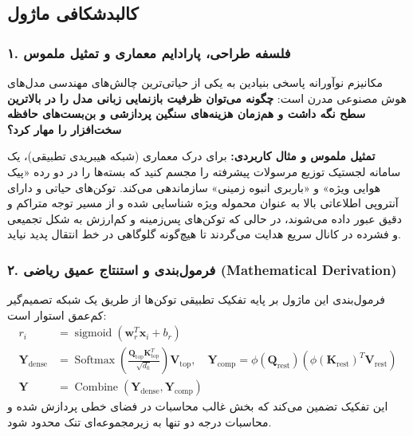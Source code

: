 \subsection{کالبدشکافی ماژول }

\subsubsection*{۱. فلسفه طراحی، پارادایم معماری و تمثیل ملموس}
مکانیزم نوآورانه  پاسخی بنیادین به یکی از حیاتی‌ترین چالش‌های مهندسی مدل‌های هوش مصنوعی مدرن است: \textbf{چگونه می‌توان ظرفیت بازنمایی زبانی مدل را در بالاترین سطح نگه داشت و هم‌زمان هزینه‌های سنگین پردازشی و بن‌بست‌های حافظه سخت‌افزار را مهار کرد؟}

\textbf{تمثیل ملموس و مثال کاربردی:}
برای درک معماری  (شبکه هیبریدی تطبیقی)، یک سامانه لجستیک توزیع مرسولات پیشرفته را مجسم کنید که بسته‌ها را در دو رده «پیک هوایی ویژه» و «باربری انبوه زمینی» سازماندهی می‌کند. توکن‌های حیاتی و دارای آنتروپی اطلاعاتی بالا به عنوان محموله ویژه شناسایی شده و از مسیر توجه متراکم و دقیق عبور داده می‌شوند، در حالی که توکن‌های پس‌زمینه و کم‌ارزش به شکل تجمیعی و فشرده در کانال سریع هدایت می‌گردند تا هیچ‌گونه گلوگاهی در خط انتقال پدید نیاید.

\subsubsection*{۲. فرمول‌بندی و استنتاج عمیق ریاضی (Mathematical Derivation)}
فرمول‌بندی این ماژول بر پایه تفکیک تطبیقی توکن‌ها از طریق یک شبکه تصمیم‌گیر کم‌عمق استوار است:
\begin{align}
r_i &= \operatorname{sigmoid}(\mathbf{w}_r^T \mathbf{x}_i + b_r) \\
\mathbf{Y}_{\text{dense}} &= \operatorname{Softmax}\left(\frac{\mathbf{Q}_{\text{top}} \mathbf{K}_{\text{top}}^T}{\sqrt{d_k}}\right) \mathbf{V}_{\text{top}}, \quad \mathbf{Y}_{\text{comp}} = \phi(\mathbf{Q}_{\text{rest}}) (\phi(\mathbf{K}_{\text{rest}})^T \mathbf{V}_{\text{rest}}) \\
\mathbf{Y} &= \operatorname{Combine}(\mathbf{Y}_{\text{dense}}, \mathbf{Y}_{\text{comp}})
\end{align}
این تفکیک تضمین می‌کند که بخش غالب محاسبات در فضای خطی پردازش شده و محاسبات درجه دو تنها به زیرمجموعه‌ای تنک محدود شود.

